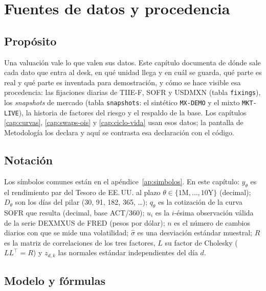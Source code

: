 \chapter{Fuentes de datos y procedencia}\label{cap:datos}
\begin{sloppypar}

\section{Propósito}\label{sec:cap13-proposito}

Una valuación vale lo que valen sus datos. Este capítulo documenta de dónde sale cada dato que entra al desk,
en qué unidad llega y en cuál se guarda, qué parte es real y qué parte es inventada para demostración, y
cómo se hace visible esa procedencia: las fijaciones diarias de TIIE-F, SOFR y USDMXN (tabla
\texttt{fixings}), los \emph{snapshots} de mercado (tabla \texttt{snapshots}: el sintético \texttt{MX-DEMO} y el
mixto \texttt{MKT-LIVE}), la historia de factores del riesgo y el respaldo de la base. Los capítulos
\ref{cap:curvas}, \ref{cap:swaps-ois} y \ref{cap:ciclo-vida} usan esos datos; la pantalla de Metodología los
declara y aquí se contrasta esa declaración con el código.

\section{Notación}\label{sec:cap13-notacion}

Los símbolos comunes están en el apéndice~\ref{ap:simbolos}. En este capítulo:
$y_\theta$ es el rendimiento par del Tesoro de EE.\,UU. al plazo $\theta\in\{\text{1M},\dots,\text{10Y}\}$ (decimal);
$D_\theta$ son los días del pilar (30, 91, 182, 365, \dots); $q_\theta$ es la cotización de la curva SOFR que
resulta (decimal, base ACT/360); $u_i$ es la $i$-ésima observación válida de la serie DEXMXUS de FRED (pesos por
dólar); $n$ es el número de cambios diarios con que se mide una volatilidad; $\hat\sigma$ es una desviación
estándar muestral; $R$ es la matriz de correlaciones de los tres factores, $L$ su factor de Cholesky
($LL^{\top}=R$) y $z_{d,k}$ las normales estándar independientes del día $d$.

\section{Modelo y fórmulas}\label{sec:cap13-modelo}


\end{sloppypar}
